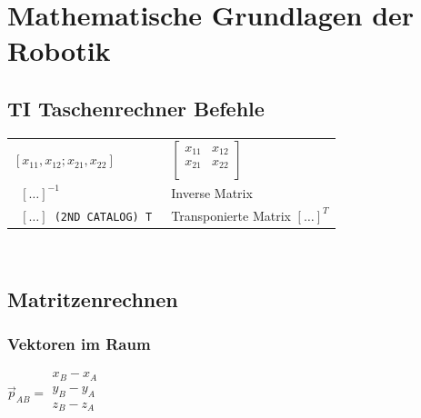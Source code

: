 \newcommand{\titleinfo}{Robotik - Formelsammlung}
\newcommand{\authorinfo}{Silvano Ferretti, Sven Arnold, Arjen Visser}
\newcommand{\versioninfo}{$Revision: 0 $ - powered by \LaTeX}

%


 
\section{Mathematische Grundlagen der Robotik}

	\subsection{TI Taschenrechner Befehle}
\begin{tabular}{p{5cm}p{10cm}}

\texttt{$[ x_{11} , x_{12} ; x_{21},x_{22}]$} &  $ \begin{bmatrix}
            	x_{11} & x_{12}\\
            	x_{21} & x_{22}\\
            \end{bmatrix} $ \\
\texttt{ $[ \ldots]^{-1} $} & Inverse Matrix\\
\texttt{ $[ \ldots] $ (2ND CATALOG) \small{T} } & Transponierte Matrix
$[\ldots]^{T}$\\

\end{tabular} \\
	

	\subsection{Matritzenrechnen}
		\subsubsection{Vektoren im Raum}
			$\vec{p}_{AB}=
			\begin{matrix}
            	x_B-x_A\\
            	y_B-y_A\\
            	z_B-z_A\\
            \end{matrix}$\\
			
